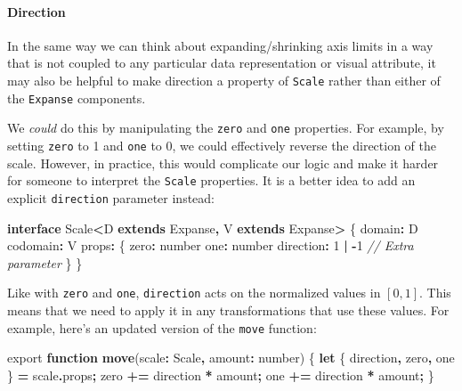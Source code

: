 \documentclass[
]{book}
\newenvironment{Shaded}{\begin{snugshade}}{\end{snugshade}}
\newcommand{\AttributeTok}[1]{\textcolor[rgb]{0.13,0.29,0.53}{#1}}
\newcommand{\CommentTok}[1]{\textcolor[rgb]{0.56,0.35,0.01}{\textit{#1}}}
\newcommand{\DataTypeTok}[1]{\textcolor[rgb]{0.13,0.29,0.53}{#1}}
\newcommand{\DecValTok}[1]{\textcolor[rgb]{0.00,0.00,0.81}{#1}}
\newcommand{\FunctionTok}[1]{\textcolor[rgb]{0.13,0.29,0.53}{\textbf{#1}}}
\newcommand{\ImportTok}[1]{#1}
\newcommand{\KeywordTok}[1]{\textcolor[rgb]{0.13,0.29,0.53}{\textbf{#1}}}
\newcommand{\NormalTok}[1]{#1}
\newcommand{\OperatorTok}[1]{\textcolor[rgb]{0.81,0.36,0.00}{\textbf{#1}}}
\theoremstyle{definition}
\theoremstyle{definition}
\theoremstyle{definition}
\theoremstyle{definition}
\theoremstyle{remark}
\begin{document}
\paragraph{Direction}\label{direction}

In the same way we can think about expanding/shrinking axis limits in a way that is not coupled to any particular data representation or visual attribute, it may also be helpful to make direction a property of \texttt{Scale} rather than either of the \texttt{Expanse} components.

We \emph{could} do this by manipulating the \texttt{zero} and \texttt{one} properties. For example, by setting \texttt{zero} to 1 and \texttt{one} to 0, we could effectively reverse the direction of the scale. However, in practice, this would complicate our logic and make it harder for someone to interpret the \texttt{Scale} properties. It is a better idea to add an explicit \texttt{direction} parameter instead:

\begin{Shaded}
\begin{Highlighting}[]
\KeywordTok{interface}\NormalTok{ Scale}\OperatorTok{\textless{}}\NormalTok{D }\KeywordTok{extends}\NormalTok{ Expanse}\OperatorTok{,}\NormalTok{ V }\KeywordTok{extends}\NormalTok{ Expanse}\OperatorTok{\textgreater{}}\NormalTok{ \{}
\NormalTok{  domain}\OperatorTok{:}\NormalTok{ D}
\NormalTok{  codomain}\OperatorTok{:}\NormalTok{ V}
\NormalTok{  props}\OperatorTok{:}\NormalTok{ \{}
\NormalTok{    zero}\OperatorTok{:} \DataTypeTok{number}
\NormalTok{    one}\OperatorTok{:} \DataTypeTok{number}
\NormalTok{    direction}\OperatorTok{:} \DecValTok{1} \OperatorTok{|} \OperatorTok{{-}}\DecValTok{1} \CommentTok{// Extra parameter}
\NormalTok{  \}}
\NormalTok{\}}
\end{Highlighting}
\end{Shaded}

Like with \texttt{zero} and \texttt{one}, \texttt{direction} acts on the normalized values in \([0, 1]\). This means that we need to apply it in any transformations that use these values. For example, here's an updated version of the \texttt{move} function:

\begin{Shaded}
\begin{Highlighting}[]
\ImportTok{export} \KeywordTok{function} \FunctionTok{move}\NormalTok{(scale}\OperatorTok{:}\NormalTok{ Scale}\OperatorTok{,}\NormalTok{ amount}\OperatorTok{:} \DataTypeTok{number}\NormalTok{) \{}
  \KeywordTok{let}\NormalTok{ \{ direction}\OperatorTok{,}\NormalTok{ zero}\OperatorTok{,}\NormalTok{ one \} }\OperatorTok{=}\NormalTok{ scale}\OperatorTok{.}\AttributeTok{props}\OperatorTok{;}
\NormalTok{  zero }\OperatorTok{+=}\NormalTok{ direction }\OperatorTok{*}\NormalTok{ amount}\OperatorTok{;}
\NormalTok{  one }\OperatorTok{+=}\NormalTok{ direction }\OperatorTok{*}\NormalTok{ amount}\OperatorTok{;}
\NormalTok{\}}
\end{Highlighting}
\end{Shaded}
\end{document}
